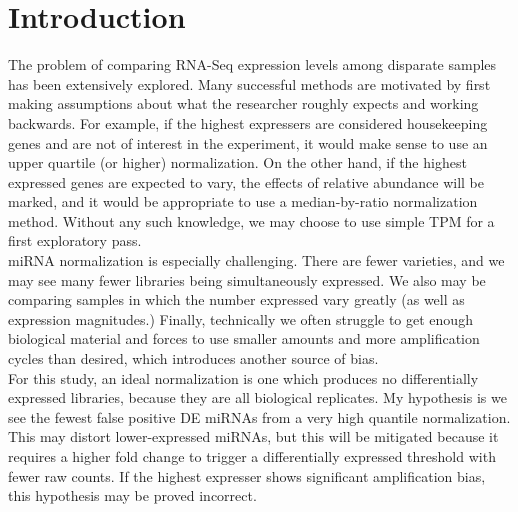 \documentclass{bioinfo}
\begin{document}
\section{Introduction}
The problem of comparing RNA-Seq expression levels among disparate samples has been extensively explored.  \citep{Conesa16} Many successful methods are motivated by first making assumptions about what the researcher roughly expects and working backwards. For example, if the highest expressers are considered housekeeping genes and are not of interest in the experiment, it would make sense to use an upper quartile (or higher) normalization. On the other hand, if the highest expressed genes are expected to vary, the effects of relative abundance will be marked, and it would be appropriate to use a median-by-ratio normalization method. Without any such knowledge, we may choose to use simple TPM for a first exploratory pass. \vspace{4pt} \\ 
miRNA normalization is especially challenging. There are fewer varieties, and we may see many fewer libraries being simultaneously expressed. We also may be comparing samples in which the number expressed vary greatly (as well as expression magnitudes.) Finally, technically we often struggle to get enough biological material and forces to use smaller amounts and more amplification cycles than desired, which introduces another source of bias.  \vspace{4pt} \\
For this study, an ideal normalization is one which produces no differentially expressed libraries, because they are all biological replicates. My hypothesis is we see the fewest false positive DE miRNAs from a very high quantile normalization. This may distort lower-expressed miRNAs, but this will be mitigated because it requires a higher fold change to trigger a differentially expressed threshold with fewer raw counts. If the highest expresser shows significant amplification bias, this hypothesis may be proved incorrect. \\
\end{document}
